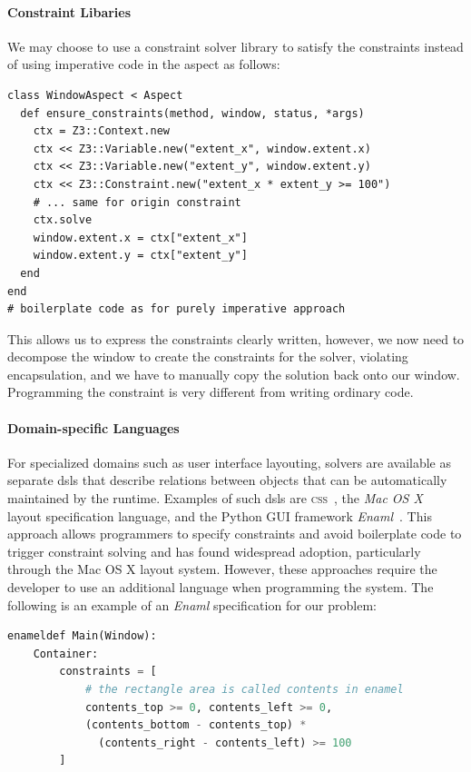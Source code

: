 \paragraph{Constraint Libaries}
We may choose to use a constraint solver library to satisfy the
constraints instead of using imperative code in the aspect as
follows:
\begin{lstlisting}
class WindowAspect < Aspect
  def ensure_constraints(method, window, status, *args)
    ctx = Z3::Context.new
    ctx << Z3::Variable.new("extent_x", window.extent.x)
    ctx << Z3::Variable.new("extent_y", window.extent.y)
    ctx << Z3::Constraint.new("extent_x * extent_y >= 100")
    # ... same for origin constraint
    ctx.solve
    window.extent.x = ctx["extent_x"]
    window.extent.y = ctx["extent_y"]
  end
end
# boilerplate code as for purely imperative approach
\end{lstlisting}
This allows us to express the constraints clearly written, however, we
now need to decompose the window to create the constraints for the
solver, violating encapsulation, and we have to manually copy the
solution back onto our window. Programming the constraint is very
different from writing ordinary code.

\paragraph{Domain-specific Languages}
For specialized domains such as user interface layouting, solvers are
available as separate \ac{dsl}s that describe relations between
objects that can be automatically maintained by the runtime. Examples
of such \acp{dsl} are \textsc{css}~\cite{lie-w3c-css2}, the \emph{Mac OS
  X}~\cite{AppleCocoaAutoLayout} layout specification language, and the Python GUI
framework \emph{Enaml}~\cite{Enaml}. This approach allows programmers
to specify constraints and avoid boilerplate code to trigger
constraint solving and has found widespread adoption, particularly
through the Mac OS X layout system. However, these approaches require
the developer to use an additional language when programming the
system. The following is an example of an \emph{Enaml} specification for our
problem:
\begin{lstlisting}[language=python]
enameldef Main(Window):
    Container:
        constraints = [
            # the rectangle area is called contents in enamel
            contents_top >= 0, contents_left >= 0,
            (contents_bottom - contents_top) *
              (contents_right - contents_left) >= 100
        ]
\end{lstlisting}

